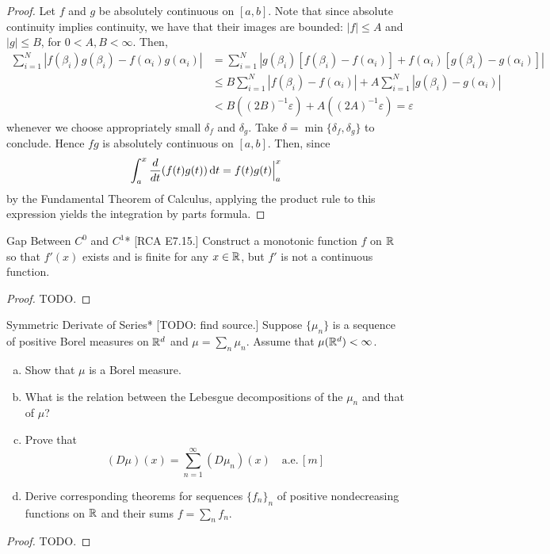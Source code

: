 \begin{proof}
    Let \(f\) and \(g\) be absolutely continuous on \([a, b]\). Note that since absolute continuity implies continuity, we have that their images are bounded: \(|f| \leq A\) and \(|g| \leq B\), for \(0 < A, B < \infty\). Then, 
    \begin{align*}
        \sum_{i=1}^N |f(\beta_i) g(\beta_i) - f(\alpha_i) g(\alpha_i)|
        &= \sum_{i=1}^N |g(\beta_i) [f(\beta_i) - f(\alpha_i)] + f(\alpha_i) [g(\beta_i) - g(\alpha_i)]| \\
        &\leq B \sum_{i=1}^N |f(\beta_i) - f(\alpha_i)| + A \sum_{i=1}^N |g(\beta_i) - g(\alpha_i)| \\
        &< B((2B)^{-1} \varepsilon) + A ((2A)^{-1} \varepsilon) 
        = \varepsilon
    \end{align*}
    whenever we choose appropriately small \(\delta_f\) and \(\delta_g\). Take \(\delta = \min\{\delta_f, \delta_g\}\) to conclude. Hence \(fg\) is absolutely continuous on \([a, b]\). Then, since
    \[
        \int_a^x \frac{d}{dt} (f(t) g(t)) \, \mathrm{d}t = f(t) g(t) \Big\rvert_a^x
    \]
    by the Fundamental Theorem of Calculus, applying the product rule to this expression yields the integration by parts formula. 
\end{proof}


\begin{problem}{Gap Between \(C^0\) and \(C^1\)}*
    [RCA E7.15.] Construct a monotonic function \(f\) on \(\mathbb{R}\) so that \(f'(x)\) exists and is finite for any \(x \in \mathbb{R}\), but \(f'\) is not a continuous function. 
\end{problem}

\begin{proof}
    TODO. 
\end{proof}


\begin{problem}{Symmetric Derivate of Series}*
    [TODO: find source.] Suppose \(\{\mu_n\}\) is a sequence of positive Borel measures on \(\mathbb{R}^d\) and \(\mu = \sum_n \mu_n\). Assume that \(\mu(\mathbb{R}^d) < \infty\). 
    \begin{enumerate}[(a)]
        \itemsep0em
        \item Show that \(\mu\) is a Borel measure.
        \item What is the relation between the Lebesgue decompositions of the \(\mu_n\) and that of \(\mu\)? 
        \item Prove that 
        \[
            (D\mu)(x) = \sum_{n=1}^\infty (D\mu_n)(x)
            \quad \text{a.e.}\, [m]
        \]
        \item Derive corresponding theorems for sequences \(\{f_n\}_n\) of positive nondecreasing functions on \(\mathbb{R}\) and their sums \(f = \sum_n f_n\). 
    \end{enumerate}
\end{problem}

\begin{proof}
    TODO. 
\end{proof}






